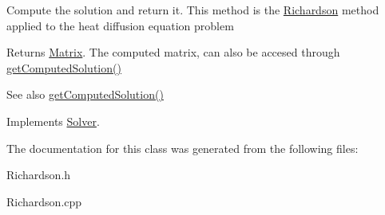 Compute the solution and return it. This method is the \mbox{\hyperlink{classRichardson}{Richardson}} method applied to the heat diffusion equation problem \begin{DoxyReturn}{Returns}
\mbox{\hyperlink{classMatrix}{Matrix}}. The computed matrix, can also be accesed through \mbox{\hyperlink{classSolver_aafe88ce4130c001052e5d93c1681f90f}{get\+Computed\+Solution()}} 
\end{DoxyReturn}
\begin{DoxySeeAlso}{See also}
\mbox{\hyperlink{classSolver_aafe88ce4130c001052e5d93c1681f90f}{get\+Computed\+Solution()}} 
\end{DoxySeeAlso}


Implements \mbox{\hyperlink{classSolver_a0f4ecfaed825407019995b5176e25748}{Solver}}.



The documentation for this class was generated from the following files\+:\begin{DoxyCompactItemize}
\item 
Richardson.\+h\item 
Richardson.\+cpp\end{DoxyCompactItemize}
